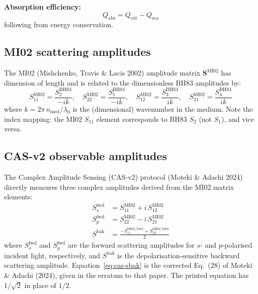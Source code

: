 \documentclass[11pt,a4paper]{article}
\begin{document}
\textbf{Absorption efficiency:}
\begin{equation}
  Q_\mathrm{abs} = Q_\mathrm{ext} - Q_\mathrm{sca}
  \label{eq:qabs}
\end{equation}
following from energy conservation.

\subsection{MI02 scattering amplitudes}

The MI02 (Mishchenko, Travis \& Lacis 2002) amplitude matrix $\mathbf{S}^\mathrm{MI02}$ has dimension of length and is related to the dimensionless BH83 amplitudes by:
\begin{equation}
  S_{11}^\mathrm{MI02} = \frac{S_2^\mathrm{BH83}}{-ik}, \quad
  S_{22}^\mathrm{MI02} = \frac{S_1^\mathrm{BH83}}{-ik}, \quad
  S_{12}^\mathrm{MI02} = \frac{S_3^\mathrm{BH83}}{ik}, \quad
  S_{21}^\mathrm{MI02} = \frac{S_4^\mathrm{BH83}}{ik}
  \label{eq:mi02-conversion}
\end{equation}
where $k = 2\pi\,n_\mathrm{med}/\lambda_0$ is the (dimensional) wavenumber in the medium.
Note the index mapping: the MI02 $S_{11}$ element corresponds to BH83 $S_2$ (not $S_1$), and vice versa.

\subsection{CAS-v2 observable amplitudes}

The Complex Amplitude Sensing (CAS-v2) protocol (Moteki \& Adachi 2024) directly measures three complex amplitudes derived from the MI02 matrix elements:
\begin{align}
  S_s^\mathrm{fwd} &= S_{11}^\mathrm{MI02} + i\,S_{12}^\mathrm{MI02} \label{eq:cas-ss} \\
  S_p^\mathrm{fwd} &= S_{22}^\mathrm{MI02} - i\,S_{21}^\mathrm{MI02} \label{eq:cas-sp} \\
  S^\mathrm{bak}   &= \frac{-S_{11}^\mathrm{MI02,bwd} + S_{22}^\mathrm{MI02,bwd}}{2} \label{eq:cas-sbak}
\end{align}
where $S_s^\mathrm{fwd}$ and $S_p^\mathrm{fwd}$ are the forward scattering amplitudes for $s$- and $p$-polarised incident light, respectively, and $S^\mathrm{bak}$ is the depolarisation-sensitive backward scattering amplitude.
Equation~\eqref{eq:cas-sbak} is the corrected Eq.~(28) of Moteki \& Adachi (2024), given in the erratum to that paper.
The printed equation has $1/\sqrt{2}$ in place of $1/2$.
\end{document}
